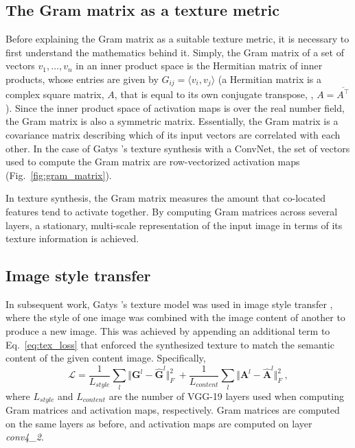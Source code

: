 \subsection{The Gram matrix as a texture metric}

Before explaining the Gram matrix as a suitable texture metric, it is necessary to first understand the mathematics behind it. Simply, the Gram matrix of a set of vectors $v_1, \dots , v_n$ in an inner product space is the Hermitian matrix of inner products, whose entries are given by $G_{ij} = \langle v_i, v_j \rangle$ (a Hermitian matrix is a complex square matrix, $A$, that is equal to its own conjugate transpose, \ie, $A = \overline{A^\top}$). Since the inner product space of activation maps is over the real number field, the Gram matrix is also a symmetric matrix. Essentially, the Gram matrix is a covariance matrix describing which of its input vectors are correlated with each other. In the case of Gatys \etal's texture synthesis with a ConvNet, the set of vectors used to compute the Gram matrix are row-vectorized activation maps (Fig.\ \ref{fig:gram_matrix}).


In texture synthesis, the Gram matrix measures the amount that co-located features tend to activate together. By computing Gram matrices across several layers, a stationary, multi-scale representation of the input image in terms of its texture information is achieved.

\subsection{Image style transfer}

In subsequent work, Gatys \etal's texture model was used in image style
transfer \cite{gatys2016image}, where the style of one image was
combined with the image content of another to produce a new image.
This was achieved by appending an additional term to Eq.\ \ref{eq:tex_loss}
that enforced the synthesized texture to match the semantic content of the given content image. Specifically,
\begin{equation}
   \mathcal{L} = \frac{1}{L_{style}} \sum_{l} \Vert \mathbf{G}^l - \hat{\mathbf{G}}^l \Vert^2_F\ + \frac{1}{L_{content}} \sum_{l} \Vert \mathbf{A}^l - \hat{\mathbf{A}}^l \Vert^2_F\ ,
   \label{eq:styletransfer_loss}
\end{equation}
where $L_{style}$ and $L_{content}$ are the number of VGG-19 layers used when computing Gram matrices and activation maps, respectively. Gram matrices are computed on the same layers as before, and activation maps are computed on layer \emph{conv4\_2}.

